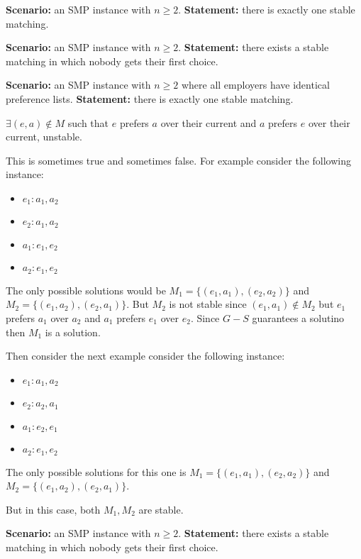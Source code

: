 \begin{questions}
	\question[3] \textbf{Scenario:} an SMP instance with $n \ge 2$. \textbf{Statement:} there is exactly one stable matching.
	\ifsolutions\fi

	\question[4] \textbf{Scenario:} an SMP instance with $n \ge 2$. \textbf{Statement:} there exists a stable matching in which nobody gets their first choice.
	\ifsolutions\fi

	\question[4] \textbf{Scenario:} an SMP instance with $n \ge 2$ where all employers have identical preference lists. \textbf{Statement:} there is exactly one stable matching.
	\ifsolutions\fi

	\(\exists (e, a) \notin M\) such that \(e\) prefers \(a\) over their current and \(a\) prefers \(e\) over their current, unstable.

	\begin{soln}
		This is sometimes true and sometimes false.
		For example consider the following instance:
		\begin{itemize}
			\item	\(e_1 : a_1, a_2\)
			\item \(e_2 : a_1, a_2\)
			\item \(a_1 : e_1, e_2\)
			\item \(a_2 : e_1, e_2\)
		\end{itemize}
		The only possible solutions would be \(M_1 = \{(e_1, a_1), (e_2, a_2)\}\) and \(M_2 = \{(e_1, a_2), (e_2, a_1)\}\).
		But \(M_2\) is not stable since \((e_1, a_1) \notin M_2\) but \(e_1\) prefers \(a_1\) over \(a_2\) and \(a_1\) prefers \(e_1\) over \(e_2\).
		Since \(G-S\) guarantees a solutino then \(M_1\) is a solution.

		Then consider the next example consider the following instance:
		\begin{itemize}
			\item	\(e_1 : a_1, a_2\)
			\item \(e_2 : a_2, a_1\)
			\item \(a_1 : e_2, e_1\)
			\item \(a_2 : e_1, e_2\)
		\end{itemize}
		The only possible solutions for this one is \(M_1 = \{(e_1, a_1), (e_2, a_2)\}\) and \(M_2 = \{(e_1, a_2), (e_2, a_1)\}\).

		But in this case, both \(M_1, M_2\) are stable.
	\end{soln}


	\question[4] \textbf{Scenario:} an SMP instance with $n \ge 2$. \textbf{Statement:} there exists a stable matching in which nobody gets their first choice.


\end{questions}
